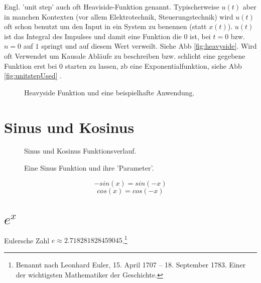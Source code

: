 Engl. 'unit step' auch oft Heaviside-Funktion genannt. Typischerweise $u(t)$ aber in manchen Kontexten (vor allem Elektrotechnik, Steuerungstechnik) wird $u(t)$ oft schon benutzt um den Input in ein System zu benennen (statt $x(t)$). $u(t)$ ist das Integral des Impulses und damit eine Funktion die $0$ ist, bei $t=0$ bzw. $n=0$ auf $1$ springt und auf diesem Wert verweilt. Siehe Abb \ref{fig:heavyside}. Wird oft Verwendet um Kausale Abläufe zu beschreiben bzw. schlicht eine gegebene Funktion erst bei 0 starten zu lassen, zb eine Exponentialfunktion, siehe Abb \ref{fig:unitstepUsed} .



\begin{figure}[H]
    \centering
    \subfigure[Einheitsschrittfunktion]{
        
        \label{fig:heavyside}
    }
    \hfill
    \caption{Heavyside Funktion und eine beispielhafte Anwendung.}
    \label{fig:unitStepComparison}
\end{figure}

\section{Sinus und Kosinus}
\begin{figure}[H]
	\centering
	
	\caption{Sinus und Kosinus Funktionsverlauf.}
	\label{fig:sincos}
\end{figure}


\begin{figure}[H]
	\centering
	
	\caption{Eine Sinus Funktion und ihre 'Parameter'.}
	\label{fig:sinParams}
\end{figure}


\begin{equation}
-sin(x) = sin(-x)
\end{equation}
\begin{equation}
cos(x) = cos(-x)
\end{equation}

\section{$e^x$}
Eulersche Zahl $e \approx 2.718281828459045$.\footnote{Benannt nach Leonhard Euler, 15. April 1707 – 18. September 1783. Einer der wichtigsten Mathematiker der Geschichte. }

